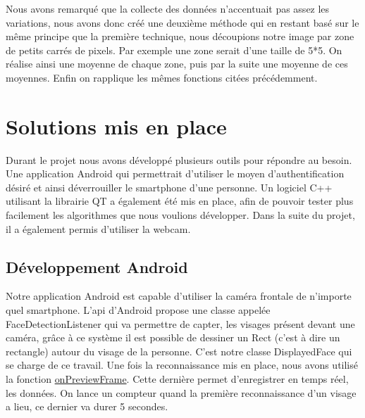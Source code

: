 Nous avons remarqué que la collecte des données n'accentuait pas assez les variations, nous avons donc créé une deuxième méthode qui en restant basé sur le même principe que la première technique, nous découpions notre image
par zone de petits carrés de pixels. Par exemple une zone serait d'une taille de 5*5. On réalise 
ainsi une moyenne de chaque zone, puis par la suite une moyenne de ces moyennes. Enfin on rapplique
les mêmes fonctions citées précédemment.

\section{Solutions mis en place}

Durant le projet nous avons développé plusieurs outils pour répondre au besoin. Une application Android qui permettrait d'utiliser le moyen d'authentification désiré et ainsi déverrouiller le smartphone d'une
personne. Un logiciel C++ utilisant la librairie QT a également été mis en place, afin de pouvoir tester plus facilement les algorithmes que nous voulions développer. Dans la suite du projet, il a également
permis d'utiliser la webcam. 

\subsection{Développement Android}

	Notre application Android est capable d'utiliser la caméra frontale de n'importe quel smartphone. L'api d'Android propose une classe appelée FaceDetectionListener qui va permettre de capter, les visages 
présent devant une caméra, grâce à ce système il est possible de dessiner un Rect (c'est à dire un rectangle) autour du visage de la personne. C'est notre classe DisplayedFace qui se charge de ce travail. 
Une fois la reconnaissance mis en place, nous avons utilisé la fonction 
\href{http://developer.android.com/reference/android/hardware/Camera.PreviewCallback.html#onPreviewFrame\%28byte\%5B\%5D,\%20android.hardware.Camera\%29}{onPreviewFrame}. Cette dernière permet d'enregistrer
en temps réel, les données. On lance un compteur quand la première reconnaissance d'un visage a lieu, ce dernier va durer 5 secondes.\\

